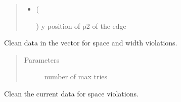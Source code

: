 \documentclass[a4paper,10pt,english]{sphinxmanual}
\begin{document}
\begin{fulllineitems}
\begin{fulllineitems}
\begin{quote}
\begin{description}
\begin{itemize}
\item {} 
 (%
\begin{footnote}[10]\sphinxAtStartFootnote
{}
%
\end{footnote}) \textendash{} y position of p2 of the edge

\end{itemize}

\end{description}\end{quote}

\end{fulllineitems}


\begin{fulllineitems}
\label{\detokenize{drc/drc:kppc.drc.kppc.drc.slcleaner.PyDrcSl.clean}}
Clean data in the vector for space and width violations.
\begin{quote}\begin{description}
\item[{Parameters}] \leavevmode
{} \textendash{} number of max tries

\end{description}\end{quote}

\end{fulllineitems}


\begin{fulllineitems}
\label{\detokenize{drc/drc:kppc.drc.kppc.drc.slcleaner.PyDrcSl.clean_space}}
Clean the current data for space violations.

\end{fulllineitems}



\end{fulllineitems}
\end{document}
